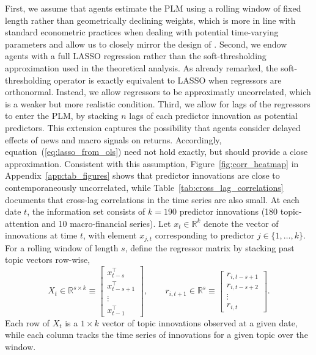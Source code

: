 First, we assume that agents estimate the PLM using a rolling window of fixed length rather than geometrically declining weights, which is more in line with standard econometric practices when dealing with potential time-varying parameters and allow us to closely mirror
the design of \cite{Chinco2019}.
Second, we endow agents with a full LASSO regression rather than the soft-thresholding approximation used in the theoretical analysis.
As already remarked, the soft-thresholding operator is exactly equivalent to LASSO when regressors are orthonormal.
Instead, we allow regressors to be approximatly uncorrelated, which is a weaker but more realistic condition.
Third, we allow for lags of the regressors to enter the PLM, by stacking $n$ lags of each predictor innovation as potential predictors.
This extension captures the possibility that agents consider delayed effects of news and macro signals on returns.
Accordingly, equation~(\ref{eq:lasso_from_ols}) need not hold exactly, but should provide a close approximation.
Consistent with this assumption, Figure~\ref{fig:corr_heatmap} in Appendix~\ref{app:tab_figures} shows that predictor innovations are close to contemporaneously uncorrelated, while Table~\ref{tab:cross_lag_correlations} documents that cross-lag correlations in the time series are also small.
At each date \(t\), the information set consists of \(k=190\) predictor innovations (180 topic-attention and 10 macro-financial series). Let
\(x_t \in \mathbb{R}^{k}\) denote the vector of innovations at time \(t\), with element
\(x_{j,t}\) corresponding to predictor \(j \in \{1,\ldots,k\}\).
For a rolling window of length \(s\), define the regressor matrix by stacking past topic
vectors row-wise,
\begin{equation}
X_t \in \mathbb{R}^{s \times k}
\equiv
\begin{bmatrix}
x_{t-s}^\top \\
x_{t-s+1}^\top \\
\vdots \\
x_{t-1}^\top
\end{bmatrix},
\qquad
r_{i,t+1} \in \mathbb{R}^{s}
\equiv
\begin{bmatrix}
r_{i,t-s+1} \\
r_{i,t-s+2} \\
\vdots \\
r_{i,t}
\end{bmatrix}.
\end{equation}
Each row of \(X_t\) is a \(1 \times k\) vector of topic innovations observed at a given date,
while each column tracks the time series of innovations for a given topic over the window.

